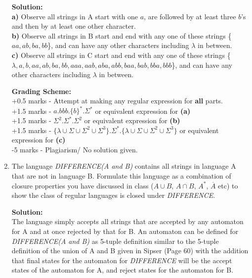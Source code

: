 \documentclass[11pt, article, oneside]{memoir}
\newcommand{\set}[1]{\{\, #1\, \}}
\DeclarePairedDelimiter\abs{\lvert}{\rvert}
\begin{document}
\begin{enumerate}

        \textbf{Solution:}
        \\\textbf{a)} Observe all strings in A start with one \(a\), are followed by at least three \(b\)'s and then by at least one other character.
        \\\textbf{b)} Observe all strings in B start and end with any one of these strings \{\(aa, ab, ba, bb\)\}, and can have any other characters including \(\lambda\) in between.
        \\\textbf{c)} Observe all strings in C start and end with any one of these strings \{\(\lambda, a, b, aa, ab, ba, bb, aaa, aab, aba, abb, baa, bab, bba, bbb\)\}, and can have any other characters including \(\lambda\) in between.

        \textbf{Grading Scheme:}
        \\+0.5 marks - Attempt at making any regular expression for \textbf{all} parts.
        \\+1.5 marks - \(a.bbb.\{b\}^*.\Sigma^*\) or equivalent expression for \textbf{(a)}
        \\+1.5 marks - \(\Sigma^2.\Sigma^*.\Sigma^2\) or equivalent expression for \textbf{(b)}
        \\+1.5 marks - \(\{\lambda \cup \Sigma \cup \Sigma^2 \cup \Sigma^3\}.\Sigma^*.\{\lambda \cup \Sigma \cup \Sigma^2 \cup \Sigma^3\}\) or equivalent expression for \textbf{(c)}
        \\-5 marks -  Plagiarism/ No solution given.
    \item
        The language \textit{DIFFERENCE(A and B)} contains all strings in language A that are not in language B. Formulate this language as a combination of closure properties you have discussed in class ($A \cup B$, $A \cap B$, $A^*$, $\overline{A}$ etc) to show the class of regular languages is closed under \textit{DIFFERENCE}.
                
        \textbf{Solution:}
        \\The language simply accepts all strings that are accepted by any automaton for A and at once rejected by that for B. An automaton can be defined  for \textit{DIFFERENCE(A and B)} as 5-tuple definition similar to the 5-tuple definition of the union of A and B given in Sipser (Page 60) with the addition that final states for the automaton for \textit{DIFFERENCE} will be the accept states of the automaton for A, and reject states for the automaton for B.
        

\end{enumerate}
\end{document}
